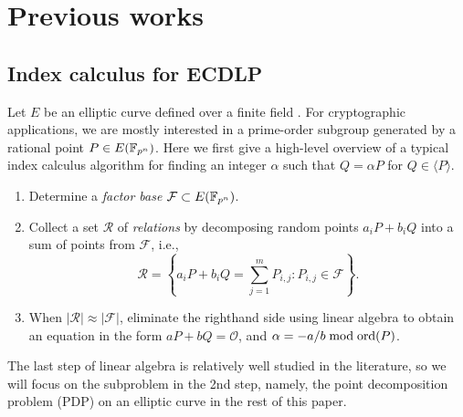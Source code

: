%
%

\section{Previous works}
\subsection{Index calculus for ECDLP}
%
\label{sec:index-calculus-ecdlp}
%
Let $E$ be an elliptic curve defined over a finite field .
%
For cryptographic applications, we are mostly interested in a
prime-order subgroup generated by a rational point $P\in E(\mathbb F_{p^n})$.
%
Here we first give a high-level overview of a typical index calculus
algorithm for finding an integer $\alpha$ such that $Q=\alpha P$ for
$Q\in\langle P\rangle$.
%
\begin{enumerate}
%
\item Determine a \emph{factor base} $\mathcal F\subset E(\mathbb F_{p^n})$.
%
\item Collect a set $\mathcal R$ of \emph{relations} by decomposing
  random points $a_iP+b_iQ$ into a sum of points from $\mathcal F$,
  i.e.,
  \[ \mathcal
    R=\left\{a_iP+b_iQ=\sum_{j=1}^mP_{i,j}:P_{i,j}\in\mathcal
      F\right\}. \]
%
\item When $|\mathcal R|\approx|\mathcal F|$, eliminate the righthand
  side using linear algebra to obtain an equation in the form
  $aP+bQ=\mathcal O$, and $\alpha=-a/b\bmod\operatorname{ord}(P)$.
%
\end{enumerate}
%
The last step of linear algebra is relatively well studied in the
literature, so we will focus on the subproblem in the 2nd step,
namely, the point decomposition problem (PDP) on an elliptic curve in
the rest of this paper.
%

